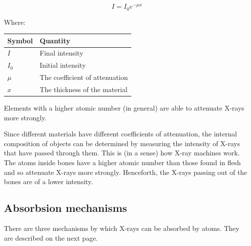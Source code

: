 \documentclass{article}
\begin{document}
\[
	I = I_0e^{-\mu x}
\]

Where:

\begin{center}
	\begin{tabular}{|l|l|}
		\hline
		{\bf Symbol} & {\bf Quantity} \\ \hline
		$I$ & Final intensity \\ \hline
		$I_0$ & Initial intensity \\ \hline
		$\mu$ & The coefficient of attenuation \\ \hline
		$x$ & The thickness of the material \\ \hline
	\end{tabular}
\end{center}

Elements with a higher atomic number (in general) are able to attenuate X-rays
more strongly.

Since different materials have different coefficients of attenuation, the
internal composition of objects can be determined by measuring the intensity of
X-rays that have passed through them. This is (in a sense) how X-ray machines
work. The atoms inside bones have a higher atomic number than those found in
flesh and so attenuate X-rays more strongly. Henceforth, the X-rays passing out
of the bones are of a lower intensity.

\subsection{Absorbsion mechanisms}

There are three mechanisms by which X-rays can be absorbed by atoms. They are
described on the next page.
\end{document}
